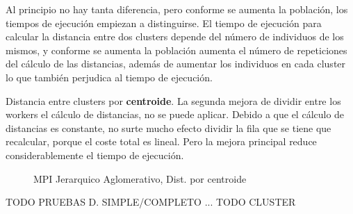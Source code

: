 Al principio no hay tanta diferencia, pero conforme se aumenta la población, los tiempos de ejecución empiezan a distinguirse. El tiempo de ejecución para calcular la distancia entre dos clusters depende del número de individuos de los mismos, y conforme se aumenta la población aumenta el número de repeticiones del cálculo de las distancias, además de aumentar los individuos en cada cluster lo que también perjudica al tiempo de ejecución.


Distancia entre clusters por \textbf{centroide}.
La segunda mejora de dividir entre los workers el cálculo de distancias, no se puede aplicar. Debido a que el cálculo de distancias es constante, no surte mucho efecto dividir la fila que se tiene que recalcular, porque el coste total es lineal. Pero la mejora principal reduce considerablemente el tiempo de ejecución.




\begin{figure}[!h]
	\centering
	\caption{ MPI Jerarquico Aglomerativo, Dist. por centroide}
\end{figure}


\color{blue} TODO PRUEBAS D. SIMPLE/COMPLETO ...
TODO CLUSTER

